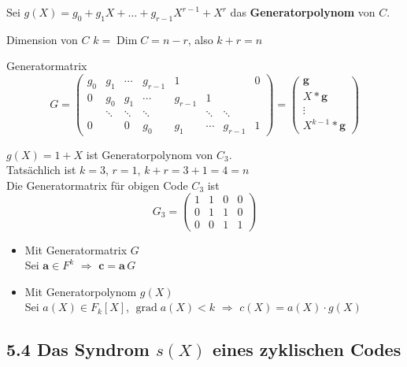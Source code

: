 \begin{satz}
Sei $g(X) = g_0 + g_1 X + \dots + g_{r-1} X^{r-1} + X^r$ das \textbf{Generatorpolynom} von $C$.

Dimension von $C$ \qquad $k = \operatorname{Dim} C = n - r$, \quad also $k + r = n$

Generatormatrix
\[
G = \begin{pmatrix}
g_0 & g_1 & \cdots & g_{r-1} & 1 & & & 0 \\
0 & g_0 & g_1 & \cdots & g_{r-1} & 1 & & \\
 & \ddots & \ddots & \ddots & & \ddots & \ddots & \\
0 & & 0 & g_0 & g_1 & \cdots & g_{r-1} & 1
\end{pmatrix}
=
\begin{pmatrix}
\mathbf{g} \\ X * \mathbf{g} \\ \vdots \\ X^{k-1} * \mathbf{g}
\end{pmatrix}
\]
\end{satz}

\begin{beispiel}
$g(X) = 1 + X$ ist Generatorpolynom von $C_3$.\\
Tatsächlich ist $k = 3$, $r = 1$, $k + r = 3 + 1 = 4 = n$\\
Die Generatormatrix für obigen Code $C_3$ ist
\[
G_3 = \begin{pmatrix}
1 & 1 & 0 & 0 \\
0 & 1 & 1 & 0 \\
0 & 0 & 1 & 1
\end{pmatrix}
\]
\end{beispiel}

\begin{algorithmus}\leavevmode
\begin{itemize}
\item[-] Mit Generatormatrix $G$\\
Sei $\mathbf{a} \in F^k$ \quad $\Rightarrow$ \quad $\mathbf{c} = \mathbf{a}\, G$
\item[-] Mit Generatorpolynom $g(X)$\\
Sei $a(X) \in F_k[X]$, $\operatorname{grad} a(X) < k$ \quad $\Rightarrow$ \quad $c(X) = a(X)\cdot g(X)$
\end{itemize}
\end{algorithmus}

\subsection{5.4 Das Syndrom $s(X)$ eines zyklischen Codes}

